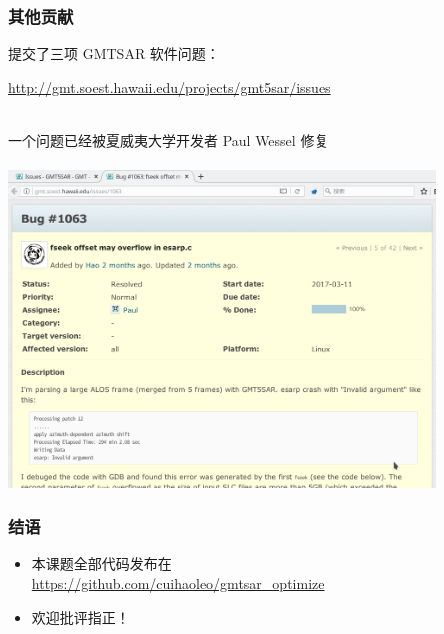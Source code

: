\documentclass{beamer}
\begin{document}
\begin{frame}
    \frametitle{其他贡献}

    提交了三项 GMTSAR 软件问题：
    \begin{scriptsize} \url{http://gmt.soest.hawaii.edu/projects/gmt5sar/issues} \end{scriptsize}\\
    一个问题已经被夏威夷大学开发者 Paul Wessel 修复 \\~\\

    \centering
    \includegraphics[width=0.85\textwidth,trim={0 5cm 0 0},clip]{figures/issue.png}
\end{frame}


\begin{frame}
    \frametitle{结语}

    \begin{itemize}
        \item 本课题全部代码发布在\\ \url{https://github.com/cuihaoleo/gmtsar_optimize}
        \item 欢迎批评指正！
    \end{itemize}
\end{frame}
\end{document}
